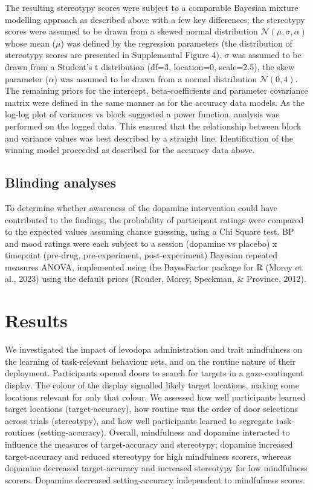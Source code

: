 \documentclass[
  man]{apa6}
\begin{document}
The resulting stereotypy scores were subject to a comparable Bayesian mixture modelling approach as described above with a few key differences; the stereotypy scores were assumed to be drawn from a skewed normal distribution \(\mathcal{N}(\mu, \sigma, \alpha)\) whose mean (\(\mu\)) was defined by the regression parameters (the distribution of stereotypy scores are presented in Supplemental Figure 4). \(\sigma\) was assumed to be drawn from a Student's t distribution (df=3, location=0, scale=2.5), the skew parameter (\(\alpha\)) was assumed to be drawn from a normal distribution \(\mathcal{N}(0,4)\). The remaining priors for the intercept, beta-coefficients and parameter covariance matrix were defined in the same manner as for the accuracy data models. As the log-log plot of variances vs block suggested a power function, analysis was performed on the logged data. This ensured that the relationship between block and variance values was best described by a straight line. Identification of the winning model proceeded as described for the accuracy data above.

\hypertarget{blinding-analyses}{%
\subsection{Blinding analyses}\label{blinding-analyses}}

\label{sec:Blinding analyses}

To determine whether awareness of the dopamine intervention could have contributed to the findings, the probability of participant ratings were compared to the expected values assuming chance guessing, using a Chi Square test. BP and mood ratings were each subject to a session (dopamine vs placebo) x timepoint (pre-drug, pre-experiment, post-experiment) Bayesian repeated measures ANOVA, implemented using the BayesFactor package for R (Morey et al., 2023) using the default priors (Rouder, Morey, Speckman, \& Province, 2012).

\hypertarget{results}{%
\section{Results}\label{results}}

\label{sec:Results}

We investigated the impact of levodopa administration and trait mindfulness on the learning of task-relevant behaviour sets, and on the routine nature of their deployment. Participants opened doors to search for targets in a gaze-contingent display. The colour of the display signalled likely target locations, making some locations relevant for only that colour. We assessed how well participants learned target locations (target-accuracy), how routine was the order of door selections
across trials (stereotypy), and how well participants learned to segregate task-routines (setting-accuracy). Overall, mindfulness and dopamine interacted to influence the measures of target-accuracy and stereotypy; dopamine increased target-accuracy and reduced stereotypy for high mindfulness scorers, whereas dopamine decreased target-accuracy and increased stereotypy for low mindfulness scorers. Dopamine decreased setting-accuracy independent to mindfulness scores.
\end{document}
